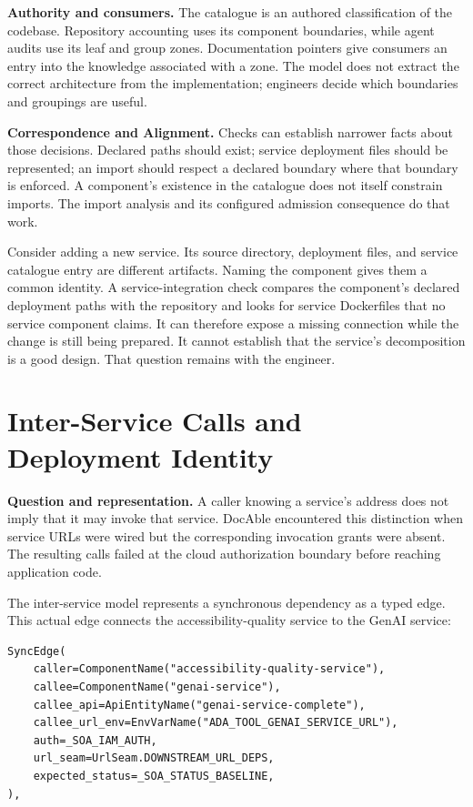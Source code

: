 \textbf{Authority and consumers.} The catalogue is an authored classification of the codebase. Repository accounting uses its component boundaries, while agent audits use its leaf and group zones. Documentation pointers give consumers an entry into the knowledge associated with a zone. The model does not extract the correct architecture from the implementation; engineers decide which boundaries and groupings are useful.

\textbf{Correspondence and Alignment.} Checks can establish narrower facts about those decisions. Declared paths should exist; service deployment files should be represented; an import should respect a declared boundary where that boundary is enforced. A component's existence in the catalogue does not itself constrain imports. The import analysis and its configured admission consequence do that work.

Consider adding a new service. Its source directory, deployment files, and service catalogue entry are different artifacts. Naming the component gives them a common identity. A service-integration check compares the component's declared deployment paths with the repository and looks for service Dockerfiles that no service component claims. It can therefore expose a missing connection while the change is still being prepared. It cannot establish that the service's decomposition is a good design. That question remains with the engineer.

\section{Inter-Service Calls and Deployment Identity}\label{heading:handbook-model-service-flow}

\textbf{Question and representation.} A caller knowing a service's address does not imply that it may invoke that service. DocAble encountered this distinction when service URLs were wired but the corresponding invocation grants were absent. The resulting calls failed at the cloud authorization boundary before reaching application code.

The inter-service model represents a synchronous dependency as a typed edge. This actual edge connects the accessibility-quality service to the GenAI service:

\begin{verbatim}
SyncEdge(
    caller=ComponentName("accessibility-quality-service"),
    callee=ComponentName("genai-service"),
    callee_api=ApiEntityName("genai-service-complete"),
    callee_url_env=EnvVarName("ADA_TOOL_GENAI_SERVICE_URL"),
    auth=_SOA_IAM_AUTH,
    url_seam=UrlSeam.DOWNSTREAM_URL_DEPS,
    expected_status=_SOA_STATUS_BASELINE,
),
\end{verbatim}

